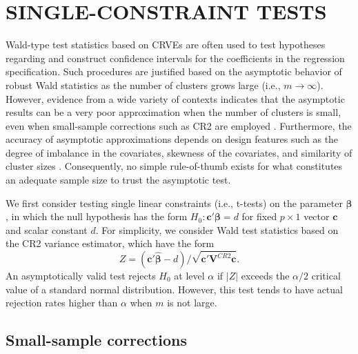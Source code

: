 \documentclass[12pt]{article}\usepackage[]{graphicx}\usepackage[]{color}
\newcommand{\bm}{\mathbf}
\newcommand{\bs}{\boldsymbol}
\begin{document}
\section{SINGLE-CONSTRAINT TESTS}
\label{sec:testing}

Wald-type test statistics based on CRVEs are often used to test hypotheses regarding and construct confidence intervals for the coefficients in the regression specification. 
Such procedures are justified based on the asymptotic behavior of robust Wald statistics as the number of clusters grows large (i.e., $m \to \infty$). 
However, evidence from a wide variety of contexts indicates that the asymptotic results can be a very poor approximation when the number of clusters is small, even when small-sample corrections such as CR2 are employed \citep{Bell2002bias, Bertrand2004how, Cameron2008bootstrap}. 
Furthermore, the accuracy of asymptotic approximations depends on design features such as the degree of imbalance in the covariates, skewness of the covariates, and similarity of cluster sizes \citep{McCaffrey2001generalizations, Tipton2015small, Webb2013wild}. 
Consequently, no simple rule-of-thumb exists for what constitutes an adequate sample size to trust the asymptotic test. 

We first consider testing single linear constraints (i.e., t-tests) on the parameter $\bs\beta$, in which the null hypothesis has the form $H_0: \bm{c}'\bs\beta = d$ for fixed $p \times 1$ vector $\bm{c}$ and scalar constant $d$. 
For simplicity, we consider Wald test statistics based on the CR2 variance estimator, which have the form
\begin{equation}
\label{eq:Wald_z}
Z = \left(\bm{c}'\bs{\hat\beta} - d\right) / \sqrt{\bm{c}'\bm{V}^{CR2}\bm{c}}.
\end{equation}
An asymptotically valid test rejects $H_0$ at level $\alpha$ if $|Z|$ exceeds the $\alpha / 2$ critical value of a standard normal distribution. 
However, this test tends to have actual rejection rates higher than $\alpha$ when $m$ is not large. 

\subsection{Small-sample corrections}
\end{document}
